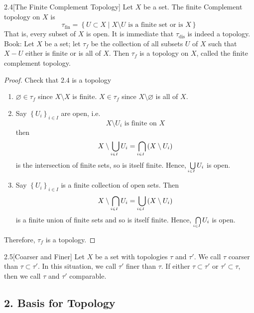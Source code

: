 \begin{customdefinition}{2.4}[The Finite Complement Topology]
Let $X$ be a set. The finite Complement topology on $X$ is 
    $$\tau_{\text{fin}} = \left\{U\subset X \mid X \setminus U \text{ is a finite set or is } X \right\}$$
    That is, every subset of $X$ is open. It is immediate that $\tau_{\text{dis}}$ is indeed a topology.\\
Book: Let $X$ be a set; let $\tau_f$ be the collection of all subsets $U$ of $X$ such that $X-U$ either is finite or is all of $X$. Then $\tau_f$ is a topology on $X$, called the finite complement topology. 
\end{customdefinition}
\begin{proof}
Check that $2.4$ is a topology
\begin{enumerate}
    \item[1).] $\varnothing \in \tau_f$ since $X\setminus X$ is finite. $X\in \tau_f$ since $X\setminus\varnothing$ is all of $X$.
    \item[2).] Say $\left\{U_i\right\}_{i\in I}$ are open, i.e.
               $$X \setminus U_i \text{ is finite on } X$$
               then
               $$X \setminus \underaccent{i \in I}{\bigcup}U_i = \underaccent{i \in I}{\bigcap}\left(X \setminus U_i\right)$$
               is the intersection of finite sets, so is itself finite. Hence, $\underaccent{i \in I}{\bigcup}U_i$ is open.
    \item[3).] Say $\left\{U_i\right\}_{i\in I}$ is a finite collection of open sets. Then
               $$X \setminus \underaccent{i \in I}{\bigcap}U_i = \underaccent{i \in I}{\bigcup}\left(X \setminus U_i\right)$$
               is a finite union of finite sets and so is itself finite. Hence, $\underaccent{i \in I}{\bigcap}U_i$ is open.          
\end{enumerate}
Therefore, $\tau_f$ is a topology.
\end{proof}

\begin{customdefinition}{2.5}[Coarser and Finer]
Let $X$ be a set with topologies $\tau$ and $\tau'$. We call $\tau$ coarser than $\tau \subset \tau'$. In this situation, we call $\tau'$ finer than $\tau$. If either $\tau \subset \tau'$ or $\tau' \subset \tau$, then we call $\tau$ and $\tau'$ comparable.
\end{customdefinition}

\newpage

\subsection*{2. Basis for Topology}

